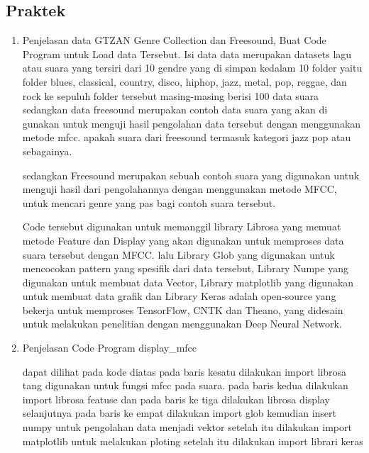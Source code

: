     \subsection{Praktek}
        \begin{enumerate}
            \item Penjelasan data GTZAN Genre Collection dan Freesound, Buat Code Program untuk Load data Tersebut.
            \subitem Isi data data merupakan datasets lagu atau suara yang tersiri dari 10 gendre yang di simpan kedalam 10 folder yaitu folder blues, classical, country, disco, hiphop, jazz, metal, pop, reggae, dan rock ke sepuluh folder tersebut masing-masing  berisi 100 data suara sedangkan data freesound merupakan contoh data suara yang akan di gunakan untuk menguji hasil pengolahan data tersebut dengan menggunakan metode mfcc. apakah suara dari freesound termasuk kategori jazz pop atau sebagainya.
            
            \subitem sedangkan Freesound merupakan sebuah contoh suara yang digunakan untuk menguji hasil dari pengolahannya dengan menggunakan metode MFCC, untuk mencari genre yang pas bagi contoh suara tersebut.
            
            
            
            \subitem Code tersebut digunakan untuk memanggil library Librosa yang memuat metode Feature dan Display yang akan digunakan untuk memproses data suara tersebut dengan MFCC. lalu Library Glob yang digunakan untuk mencocokan pattern yang spesifik dari data tersebut, Library Numpe yang digunakan untuk membuat data Vector, Library matplotlib yang digunakan untuk membuat data grafik dan Library Keras adalah open-source yang bekerja untuk memproses TensorFlow, CNTK dan Theano, yang didesain untuk melakukan penelitian dengan menggunakan Deep Neural Network.
            
            \item Penjelasan Code Program display\_mfcc
            
            
            
            \subitem dapat dilihat pada kode diatas pada baris kesatu dilakukan import librosa tang digunakan untuk fungsi mfcc pada suara. pada baris kedua dilakukan import librosa featuse dan pada baris ke tiga dilakukan librosa display selanjutnya pada baris ke empat dilakukan import glob kemudian insert numpy untuk pengolahan data menjadi vektor setelah itu dilakukan import matplotlib untuk melakukan ploting setelah itu dilakukan import librari keras
            

\end{enumerate}
